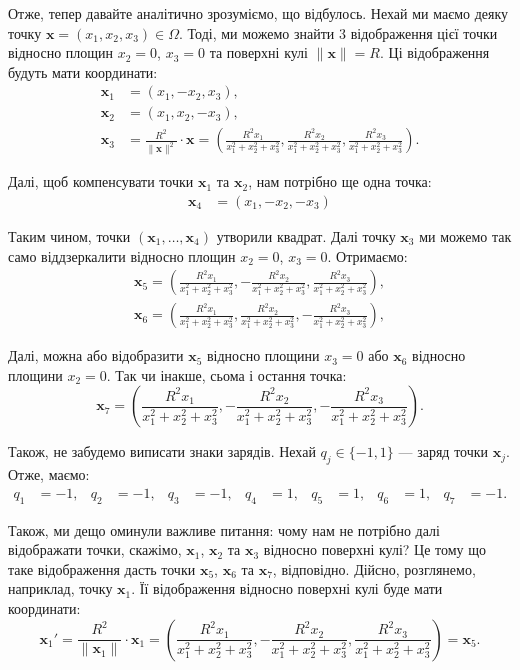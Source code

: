 \documentclass{hw_template}
\begin{document}
Отже, тепер давайте аналітично зрозуміємо, що відбулось. Нехай ми маємо деяку точку $\mathbf{x} = (x_1, x_2, x_3) \in \Omega$. Тоді, ми можемо знайти 3 відображення цієї точки відносно площин $x_2=0$, $x_3=0$ та поверхні кулі $\|\mathbf{x}\|=R$. Ці відображення будуть мати координати:
\begin{align*}
    \mathbf{x}_1 &= (x_1, -x_2, x_3), \\
    \mathbf{x}_2 &= (x_1, x_2, -x_3), \\
    \mathbf{x}_3 &= \frac{R^2}{\|\mathbf{x}\|^2} \cdot \mathbf{x} = \left(\frac{R^2x_1}{x_1^2 + x_2^2 + x_3^2}, \frac{R^2x_2}{x_1^2 + x_2^2 + x_3^2}, \frac{R^2x_3}{x_1^2 + x_2^2 + x_3^2}\right).
\end{align*}

Далі, щоб компенсувати точки $\mathbf{x}_1$ та $\mathbf{x}_2$, нам потрібно ще одна точка:
\begin{align*}
    \mathbf{x}_4 &= (x_1, -x_2, -x_3)
\end{align*}

Таким чином, точки $(\mathbf{x}_1,\dots,\mathbf{x}_4)$ утворили квадрат. Далі точку $\mathbf{x}_3$ ми можемо так само віддзеркалити відносно площин $x_2=0$, $x_3=0$. Отримаємо:
\begin{align*}
    \mathbf{x}_5 = \left(\frac{R^2x_1}{x_1^2 + x_2^2 + x_3^2}, -\frac{R^2x_2}{x_1^2 + x_2^2 + x_3^2}, \frac{R^2x_3}{x_1^2 + x_2^2 + x_3^2}\right), \\
    \mathbf{x}_6 = \left(\frac{R^2x_1}{x_1^2 + x_2^2 + x_3^2}, \frac{R^2x_2}{x_1^2 + x_2^2 + x_3^2}, -\frac{R^2x_3}{x_1^2 + x_2^2 + x_3^2}\right),
\end{align*}

Далі, можна або відобразити $\mathbf{x}_5$ відносно площини $x_3=0$ або $\mathbf{x}_6$ відносно площини $x_2=0$. Так чи інакше, сьома і остання точка:
\begin{equation*}
    \mathbf{x}_7 = \left(\frac{R^2x_1}{x_1^2 + x_2^2 + x_3^2}, -\frac{R^2x_2}{x_1^2 + x_2^2 + x_3^2}, -\frac{R^2x_3}{x_1^2 + x_2^2 + x_3^2}\right).
\end{equation*}

Також, не забудемо виписати знаки зарядів. Нехай $q_j \in \{-1,1\}$ --- заряд точки $\mathbf{x}_j$. Отже, маємо:
\begin{align*}
    q_1 &= -1, & q_2 &= -1, & q_3 &= -1, & q_4 &= 1, & q_5 &= 1, & q_6 &= 1, & q_7 &= -1.
\end{align*}

Також, ми дещо оминули важливе питання: чому нам не потрібно далі відображати точки, скажімо, $\mathbf{x}_1$, $\mathbf{x}_2$ та $\mathbf{x}_3$ відносно поверхні кулі? Це тому що таке відображення дасть точки $\mathbf{x}_5$, $\mathbf{x}_6$ та $\mathbf{x}_7$, відповідно. Дійсно, розглянемо, наприклад, точку $\mathbf{x}_1$. Її відображення відносно поверхні кулі буде мати координати:
\begin{equation*}
    \mathbf{x}_1' = \frac{R^2}{\|\mathbf{x}_1\|} \cdot \mathbf{x}_1 = \left(\frac{R^2x_1}{x_1^2 + x_2^2 + x_3^2}, -\frac{R^2x_2}{x_1^2 + x_2^2 + x_3^2}, \frac{R^2x_3}{x_1^2 + x_2^2 + x_3^2}\right) = \mathbf{x}_5.
\end{equation*}
\end{document}
